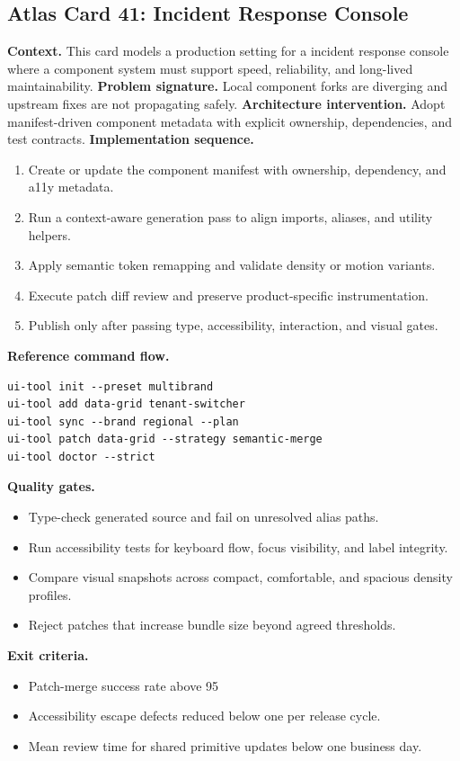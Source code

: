 \subsection*{Atlas Card 41: Incident Response Console}
\textbf{Context.} This card models a production setting for a incident response console where a component system must support speed, reliability, and long-lived maintainability.
\textbf{Problem signature.} Local component forks are diverging and upstream fixes are not propagating safely.
\textbf{Architecture intervention.} Adopt manifest-driven component metadata with explicit ownership, dependencies, and test contracts.
\textbf{Implementation sequence.}
\begin{enumerate}[leftmargin=*, itemsep=0.28em]
  \item Create or update the component manifest with ownership, dependency, and a11y metadata.
  \item Run a context-aware generation pass to align imports, aliases, and utility helpers.
  \item Apply semantic token remapping and validate density or motion variants.
  \item Execute patch diff review and preserve product-specific instrumentation.
  \item Publish only after passing type, accessibility, interaction, and visual gates.
\end{enumerate}
\textbf{Reference command flow.}
\begin{verbatim}
ui-tool init --preset multibrand
ui-tool add data-grid tenant-switcher
ui-tool sync --brand regional --plan
ui-tool patch data-grid --strategy semantic-merge
ui-tool doctor --strict
\end{verbatim}
\textbf{Quality gates.}
\begin{itemize}[leftmargin=*, itemsep=0.24em]
  \item Type-check generated source and fail on unresolved alias paths.
  \item Run accessibility tests for keyboard flow, focus visibility, and label integrity.
  \item Compare visual snapshots across compact, comfortable, and spacious density profiles.
  \item Reject patches that increase bundle size beyond agreed thresholds.
\end{itemize}
\textbf{Exit criteria.}
\begin{itemize}[leftmargin=*, itemsep=0.24em]
  \item Patch-merge success rate above 95%
  \item Accessibility escape defects reduced below one per release cycle.
  \item Mean review time for shared primitive updates below one business day.
\end{itemize}
\clearpage
